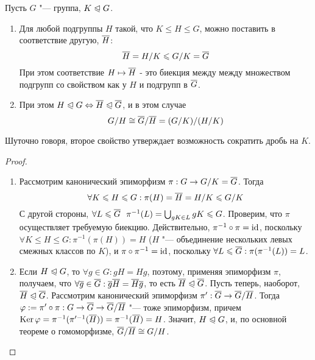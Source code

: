 \begin{theorem}
	Пусть $G$ "--- группа, $K \trianglelefteqslant G$. 
	\begin{enumerate}
		\item Для любой подгруппы $H$ такой, что $K \le H \le G$, можно поставить в соответствие другую, $\overline{H}$:
		\[
			\overline{H} = H / K \leqslant G / K = \overline{G}
		\]
		При этом соответствие $H \mapsto \overline{H}$ - это биекция между между множеством подгрупп со свойством как у $H$ и подгрупп в $\overline{G}$.
		
		\item При этом $H \trianglelefteqslant G \Leftrightarrow \overline{H} \trianglelefteqslant \overline{G}$, и в этом случае
		\[
			G / H \cong \overline{G} / \overline{H} = (G / K) / (H / K)
		\]
	\end{enumerate}
\end{theorem}

\begin{note}
	Шуточно говоря, второе свойство утверждает возможность сократить дробь на $K$.
\end{note}

\begin{proof}~
	\begin{enumerate}
		\item Рассмотрим канонический эпиморфизм $\pi: G \to G / K = \overline{G}$. Тогда
		\[
			\forall K \leqslant H \leqslant G: \pi(H) =\overline{H} = H / K \leqslant G / K
		\]
		С другой стороны, $\forall L \le \ol{G}\ \ \pi^{-1}(L) = \bigcup_{gK \in L}gK \hm\le G$. Проверим, что $\pi$ осуществляет требуемую биекцию. Действительно, $\pi^{-1}\circ\pi \hm= \id$, поскольку $\forall K \le H \le G: \pi^{-1}(\pi(H)) = H$ ($H$ "--- объединение нескольких левых смежных классов по $K$), и $\pi\circ\pi^{-1} = \operatorname{id}$, поскольку $\forall L \leqslant \overline{G}: \pi(\pi^{-1}(L)) = L$.
		
		\item Если $H \trianglelefteqslant G$, то $\forall g \in G: gH = Hg$, поэтому, применяя эпиморфизм $\pi$, получаем, что $\forall \overline{g} \in \overline{G}: \overline{g}\overline{H} = \overline{H}\overline{g}$, то есть $\overline{H} \trianglelefteqslant \overline{G}$. Пусть теперь, наоборот, $\overline{H} \trianglelefteqslant \overline{G}$. Рассмотрим канонический эпиморфизм $\pi': \overline{G} \to \overline{G} / \overline{H}$. Тогда $\phi := \pi'\circ\pi: G \hm\to \ol{G} \hm\to \ol{G} / \ol{H}$ "--- тоже эпиморфизм, причем $\ke \phi = \pi^{-1}(\pi'^{-1}(\ol{H})) \hm= \pi^{-1}(\ol{H}) = H$. Значит, $H \trianglelefteqslant G$, и, по основной теореме о гомоморфизме, $\overline{G} / \overline{H} \cong G / H$.
	\end{enumerate}
\end{proof}


